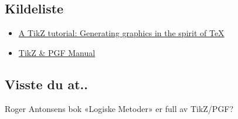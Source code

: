 \documentclass[11pt, a4paper]{article}
\begin{document}
\subsection{Kildeliste}
\begin{itemize}
	\item
	\href{http://www.tug.org/TUGboat/tb30-2/tb95mertz.pdf}{A TikZ tutorial: Generating graphics in the spirit of \TeX}
	\item
	\href{http://www.texample.net/media/pgf/builds/pgfmanualCVS2012-11-04.pdf}{TikZ \& PGF Manual}
\end{itemize}


\subsection*{Visste du at..}
Roger Antonsens bok «Logiske Metoder» er full av TikZ/PGF?
\end{document}
